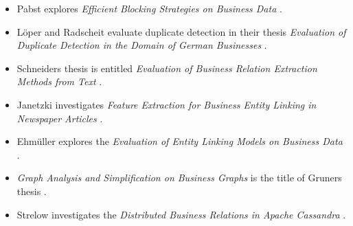 \begin{itemize}
\item Pabst explores \emph{Efficient Blocking Strategies on Business Data} \cite{pabst}.
\item Löper and Radscheit evaluate duplicate detection in their thesis \emph{Evaluation of Duplicate Detection in the Domain of German Businesses} \cite{loeperradscheit}.
\item Schneider\grq s thesis is entitled \emph{Evaluation of Business Relation Extraction Methods from Text} \cite{schneider}.
\item Janetzki investigates \emph{Feature Extraction for Business Entity Linking in Newspaper Articles} \cite{janetzki}.
\item Ehmüller explores the \emph{Evaluation of Entity Linking Models on Business Data} \cite{ehmueller}.
\item \emph{Graph Analysis and Simplification on Business Graphs} is the title of Gruner\grq s thesis \cite{gruner}.
\item Strelow investigates the \emph{Distributed Business Relations in Apache Cassandra} \cite{strelow}.

\end{itemize}